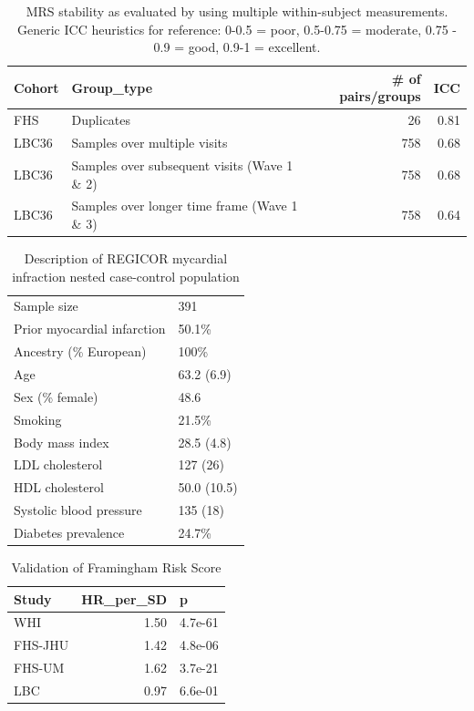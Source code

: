 \documentclass[]{article}
\begin{document}
\begin{table}[!h]

\caption{\label{tab:stability}MRS stability as evaluated by using multiple within-subject measurements. Generic ICC heuristics for reference: 0-0.5 = poor, 0.5-0.75 = moderate, 0.75 - 0.9 = good, 0.9-1 = excellent.}
\centering
\begin{tabular}{llrr}
\toprule
Cohort & Group\_type & \# of pairs/groups & ICC\\
\midrule
FHS & Duplicates & 26 & 0.81\\
LBC36 & Samples over multiple visits & 758 & 0.68\\
LBC36 & Samples over subsequent visits (Wave 1 \& 2) & 758 & 0.68\\
LBC36 & Samples over longer time frame (Wave 1 \& 3) & 758 & 0.64\\
\bottomrule
\end{tabular}
\end{table}

\begin{table}[t]

\caption{\label{tab:regicor-description}Description of REGICOR mycardial infraction nested case-control population}
\centering
\begin{tabular}{ll}
\toprule
Sample size & 391\\
Prior myocardial infarction & 50.1\%\\
Ancestry (\% European) & 100\%\\
Age & 63.2 (6.9)\\
Sex (\% female) & 48.6\\
\addlinespace
Smoking & 21.5\%\\
Body mass index & 28.5 (4.8)\\
LDL cholesterol & 127 (26)\\
HDL cholesterol & 50.0 (10.5)\\
Systolic blood pressure & 135 (18)\\
\addlinespace
Diabetes prevalence & 24.7\%\\
\bottomrule
\end{tabular}
\end{table}

\begin{table}[t]

\caption{\label{tab:risk-score-validation}Validation of Framingham Risk Score}
\centering
\begin{tabular}{lrl}
\toprule
Study & HR\_per\_SD & p\\
\midrule
WHI & 1.50 & 4.7e-61\\
FHS-JHU & 1.42 & 4.8e-06\\
FHS-UM & 1.62 & 3.7e-21\\
LBC & 0.97 & 6.6e-01\\
\bottomrule
\end{tabular}
\end{table}
\end{document}

